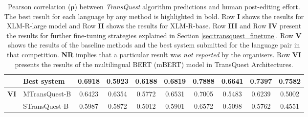 \begin{table}[t]
\begin{center}
{\begin{tabular}{l l  c c c c c c c c}
			& Best system & 0.6918 & 0.5923 & 0.6188 & 0.6819 & 0.7888 & \textbf{0.6641} & 0.7397 &  \textbf{0.7582} \\
			\midrule
			\multirow{2}{*}{\bf VI} & MTransQuest-B & 0.6423 & 0.6354 & 0.5772 & 0.6531 & 0.7005 & 0.5483 & 0.6239 & 0.5002 \\
			& STransQuest-B & 0.5987 & 0.5872 & 0.5012 & 0.5901 & 0.6572 & 0.5098& 0.5762 & 0.4551 \\
			\bottomrule
		\end{tabular}
	}
	\end{center}
	\caption[Pearson correlation between TransQuest algorithm predictions and human post-editing effort]{Pearson correlation ($\bm{\rho}$) between \textit{TransQuest} algorithm predictions and human post-editing effort. The best result for each language by any method is highlighted in bold. Row \textbf{I} shows the results for XLM-R-large model and Row \textbf{II} shows the results for XLM-R-base. Row \textbf{III} and Row \textbf{IV} present the results for further fine-tuning strategies explained in Section \ref{sec:transquest_finetune}. Row \textbf{V} shows the results of the baseline methods and the best system submitted for the language pair in that competition. \textbf{NR} implies that a particular result was \textit{not reported} by the organisers. Row \textbf{VI} presents the results of the multilingual BERT (mBERT) model in TransQuest Architectures.} 
	\label{tab:hter_prediction}
\end{table}




